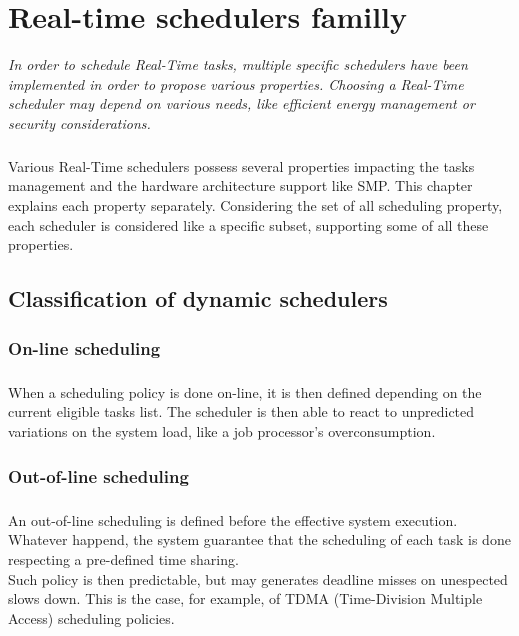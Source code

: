 
\chapter{Real-time schedulers familly}

{\it
In order to schedule Real-Time tasks, multiple specific schedulers have been implemented in order
to propose various properties. Choosing a Real-Time scheduler may depend on various needs, like
efficient energy management or security considerations.
}

\doMinitoc

\paragraph{}
Various Real-Time schedulers possess several properties impacting the tasks management and the
hardware architecture support like SMP. This chapter explains each property separately. Considering
the set of all scheduling property, each scheduler is considered like a specific subset, supporting
some of all these properties.

\section{Classification of dynamic schedulers}

\subsection{On-line scheduling}

\paragraph{}
When a scheduling policy is done on-line, it is then defined depending on the current eligible
tasks list. The scheduler is then able to react to unpredicted variations on the system load, like
a job processor's overconsumption.

\subsection{Out-of-line scheduling}

\paragraph{}
An out-of-line scheduling is defined before the effective system execution. Whatever happend, the
system guarantee that the scheduling of each task is done respecting a pre-defined time sharing.\\
Such policy is then predictable, but may generates deadline misses on unespected slows down. This
is the case, for example, of TDMA (Time-Division Multiple Access) scheduling policies.

